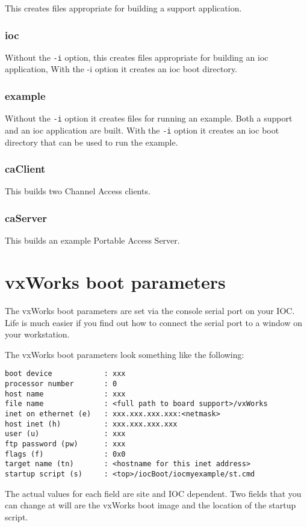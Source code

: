 This creates files appropriate for building a support application.

\subsubsection{ioc}

 Without the \verb|-i| option, this creates files appropriate for building an ioc application, With the -i option it creates an ioc boot 
directory.

\subsubsection{example}

Without the \verb|-i| option it creates files for running an example. Both a support and an ioc application are built. With the \verb|-i|
option it creates an ioc boot directory that can be used to run the example.

\subsubsection{caClient}

This builds two Channel Access clients.

\subsubsection{caServer}

This builds an example Portable Access Server.

\section{vxWorks boot parameters}

The vxWorks boot parameters are set via the console serial port on your IOC. Life is much easier if you find out how to 
connect the serial port to a window on your workstation.

The vxWorks boot parameters look something like the following:

\begin{verbatim}
boot device            : xxx
processor number       : 0
host name              : xxx
file name              : <full path to board support>/vxWorks
inet on ethernet (e)   : xxx.xxx.xxx.xxx:<netmask>
host inet (h)          : xxx.xxx.xxx.xxx
user (u)               : xxx
ftp password (pw)      : xxx
flags (f)              : 0x0
target name (tn)       : <hostname for this inet address>
startup script (s)     : <top>/iocBoot/iocmyexample/st.cmd
\end{verbatim}
The actual values for each field are site and IOC dependent. Two fields that you can change at will are the vxWorks boot 
image and the location of the startup script.

